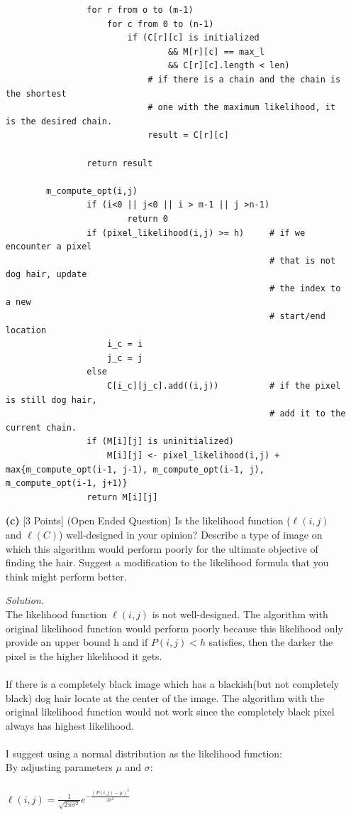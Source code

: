 \documentclass[10pt]{article}
\begin{document}
\begin{enumerate}
\begin{mdframed}
\begin{lstlisting}
                for r from o to (m-1)
                    for c from 0 to (n-1)
                        if (C[r][c] is initialized 
                                && M[r][c] == max_l 
                                && C[r][c].length < len)
                            # if there is a chain and the chain is the shortest 
                            # one with the maximum likelihood, it is the desired chain.
                            result = C[r][c]
    
                return result
                
        m_compute_opt(i,j)
                if (i<0 || j<0 || i > m-1 || j >n-1)
                        return 0
                if (pixel_likelihood(i,j) >= h)     # if we encounter a pixel 
                                                    # that is not dog hair, update
                                                    # the index to a new 
                                                    # start/end location
                    i_c = i
                    j_c = j
                else
                    C[i_c][j_c].add((i,j))          # if the pixel is still dog hair,
                                                    # add it to the current chain.
                if (M[i][j] is uninitialized)
                    M[i][j] <- pixel_likelihood(i,j) + max{m_compute_opt(i-1, j-1), m_compute_opt(i-1, j), m_compute_opt(i-1, j+1)}
                return M[i][j]
        \end{lstlisting}
        
        
    \end{mdframed}
    \item[\textbf{(c)}] {[3 Points]} (Open Ended Question) Is the likelihood function ($\ell (i, j)$ and $\ell (C)$) well-designed in your opinion? Describe a type of image on which this algorithm would perform poorly for the ultimate objective of finding the hair. Suggest a modification to the likelihood formula that you think might perform better.
    \begin{mdframed}
        \textit{Solution.}\\
        The likelihood function $\ell(i,j)$ is not well-designed. The algorithm with original likelihood function would perform poorly because this likelihood only provide an upper bound h and if $P(i,j) < h$ satisfies, then the darker the pixel is the higher likelihood it gets.
        \\
        \\If there is a completely black image which has a blackish(but not completely black) dog hair locate at the center of the image. The algorithm with the original likelihood function would not work since the completely black pixel always has highest likelihood. 
        \\
        \\I suggest using a normal distribution as the likelihood function:
        \\By adjusting parameters $\mu$ and $\sigma$:
        \\
        \\$\ell(i,j)=\frac{1}{\sqrt{2\pi\sigma^2}}e^{-\frac{(P(i,j)-\mu)^2}{2\sigma^2}}$
        

\end{mdframed}
\end{enumerate}
\end{document}
